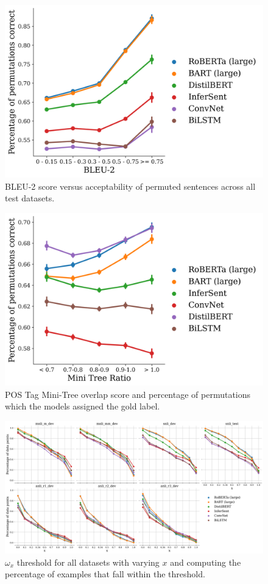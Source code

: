 \documentclass[letterpaper, 12pt]{report}
\begin{document}
\begin{figure}[htbp]
\centering
\includegraphics[width=.9\linewidth]{figs/unli/bleu_2_all.png}
\caption{BLEU-2 score versus acceptability of permuted sentences across all test datasets.}
\end{figure}

\begin{figure}[htbp]
\centering
\includegraphics[width=.9\linewidth]{figs/unli/min_tree_4.png}
\caption{POS Tag Mini-Tree overlap score and percentage of permutations which the models assigned the gold label.}
\end{figure}

\begin{figure}[htbp]
\centering
\includegraphics[width=.9\linewidth]{figs/unli/omega_threshold.png}
\caption{\(\omega_{x}\) threshold for all datasets with varying \(x\) and computing the percentage of examples that fall within the threshold.}
\end{figure}
\end{document}
